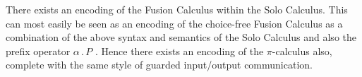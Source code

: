     \begin{remark*}
        There exists an encoding of the Fusion Calculus within the Solo Calculus.
        This can most easily be seen as an encoding of the choice-free Fusion Calculus as a combination of the above syntax and semantics of the Solo Calculus and also the prefix operator $\alpha \, . \, P$\footnotemark
        .
        Hence there exists an encoding of the $\pi$-calculus also, complete with the same style of guarded input/output communication.
    \end{remark*}
